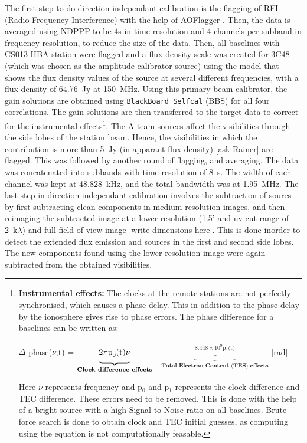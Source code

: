 \documentclass[../main/thesis_msc.tex]{subfiles}
\begin{document}
The first step to do direction independant calibration is the flagging of RFI (Radio Frequency Interference) with the help of \href{https://sourceforge.net/projects/aoflagger/}{AOFlagger} \citep{aoflagger}. Then, the data is averaged using \href{https://www.astron.nl/lofarwiki/doku.php?id=public:user_software:documentation:ndppp}{NDPPP} to be 4s in time resolution and 4 channels per subband in frequency resolution, to reduce the size of the data. Then, all baselines with CS013 HBA station were flagged and a flux density scale was created for 3C48 (which was chosen as the amplitude calibrator source) using the model that shows the flux density values of the source at several different frequencies, with a flux density of 64.76~Jy at 150~MHz. Using this primary beam calibrator, the gain solutions are obtained using \verb|BlackBoard Selfcal| (BBS) for all four correlations. The gain solutions are then transferred to the target\citep{BBS} data to correct for the instrumental effects\footnote{\textbf{Instrumental effects:}  The clocks at the remote stations are not perfectly synchronised, which causes a phase delay. This in addition to the phase delay by the ionosphere gives rise to phase errors. The phase difference for a baselines can be written as: \begin{center}
$\Delta$ phase($\nu$,t) =  $\underbrace{ \vphantom{\frac{8.448 \times 10^9 \textrm{p}_1 \textrm{(t)}}{\nu}} 2\pi \textrm{p}_0\textrm{(t)} \nu}_{\textbf{Clock difference effects}}$ - $\underbrace{\frac{8.448 \times 10^9 \textrm{p}_1 \textrm{(t)}}{\nu}}_{\textbf{Total Electron Content (TES) effects}}$ [rad] \end{center} Here $\nu$ represents frequency and p$_0$ and p$_1$ represents the clock difference and TEC difference. These errors need to be removed. This is done with the help of a bright source with a high Signal to Noise ratio on all baselines. Brute force search is done to obtain clock and TEC initial guesses, as computing using the equation is not computationally feasable.}. The A team sources affect the visibilities through the side lobes of the station beam. Hence, the visibilities in which the contribution is more than 5~Jy (in apparant flux density) [ask Rainer] are flagged. This was followed by another round of flagging, and averaging. The data was concatenated into subbands with time resolution of 8~s. The width of each channel was kept at 48.828~kHz, and the total bandwidth was at 1.95~MHz. The last step in direction independant calibration involves the subtraction of soures by first subtracting clean components in medium resolution images, and then reimaging the subtracted image at a lower resolution (1.5' and uv cut range of 2~k$\lambda$) and full field of view image [write dimensions here]. This is done inorder to detect the extended flux emission and sources in the first and second side lobes. The new components found using the lower resolution image were again subtracted  from the obtained visibilities. 
\end{document}
